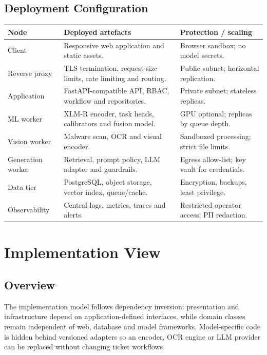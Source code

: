\documentclass[10pt,letterpaper]{article}
\begin{document}
\subsection*{Deployment Configuration}
\begin{table}[H]\centering\small
\begin{tabularx}{\textwidth}{|L{1.4in}|Y|L{1.9in}|}\hline
\textbf{Node} & \textbf{Deployed artefacts} & \textbf{Protection / scaling}\\\hline
Client & Responsive web application and static assets. & Browser sandbox; no model secrets.\\\hline
Reverse proxy & TLS termination, request-size limits, rate limiting and routing. & Public subnet; horizontal replication.\\\hline
Application & FastAPI-compatible API, RBAC, workflow and repositories. & Private subnet; stateless replicas.\\\hline
ML worker & XLM-R encoder, task heads, calibrators and fusion model. & GPU optional; replicas by queue depth.\\\hline
Vision worker & Malware scan, OCR and visual encoder. & Sandboxed processing; strict file limits.\\\hline
Generation worker & Retrieval, prompt policy, LLM adapter and guardrails. & Egress allow-list; key vault for credentials.\\\hline
Data tier & PostgreSQL, object storage, vector index, queue/cache. & Encryption, backups, least privilege.\\\hline
Observability & Central logs, metrics, traces and alerts. & Restricted operator access; PII redaction.\\\hline
\end{tabularx}
\end{table}

\section{Implementation View}
\subsection{Overview}
The implementation model follows dependency inversion: presentation and infrastructure depend on application-defined interfaces, while domain classes remain independent of web, database and model frameworks. Model-specific code is hidden behind versioned adapters so an encoder, OCR engine or LLM provider can be replaced without changing ticket workflows.
\end{document}
